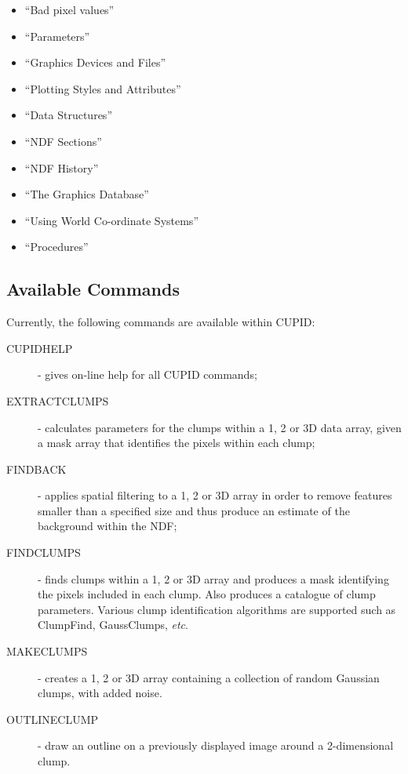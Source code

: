 \documentclass[twoside,11pt]{article}
\newcommand{\htmlref}[2]{#1}
\newcommand{\xref}[3]{#1}
\newcommand{\xlabel}[1]{}
\renewcommand{\_}{\texttt{\symbol{95}}}
\begin{document}
\begin{itemize}
\item ``\xref{Bad pixel values}{sun95}{se_masking}''
\item ``\xref{Parameters}{sun95}{se_param}''
\item ``\xref{Graphics Devices and Files}{sun95}{se_graphdev}''
\item ``\xref{Plotting Styles and Attributes}{sun95}{se_style}''
\item ``\xref{Data Structures}{sun95}{se_datastr}''
\item ``\xref{NDF Sections}{sun95}{se_ndfsect}''
\item ``\xref{NDF History}{sun95}{se_ndfhistory}''
\item ``\xref{The Graphics Database}{sun95}{se_agitate}''
\item ``\xref{Using World Co-ordinate Systems}{sun95}{se_wcsuse}''
\item ``\xref{Procedures}{sun95}{se_procedures}''
\end{itemize}

\subsection{\xlabel{availablecommands}Available Commands}
Currently, the following commands are available within CUPID:
\begin{description}

\item[\htmlref{CUPIDHELP}{CUPIDHELP}] - gives on-line help for all CUPID
commands;

\item[\htmlref{EXTRACTCLUMPS}{EXTRACTCLUMPS}] - calculates parameters for
the clumps within a 1, 2 or 3D data array, given a mask array that identifies
the pixels within each clump;

\item[\htmlref{FINDBACK}{FINDBACK}] - applies spatial filtering to a 1, 2
or 3D array in order to remove features smaller than a specified size and
thus produce an estimate of the background within the NDF;

\item[\htmlref{FINDCLUMPS}{FINDCLUMPS}] - finds clumps within a 1, 2 or 3D
array and produces a mask identifying the pixels included in each clump.
Also produces a catalogue of clump parameters. Various clump
identification algorithms are supported such as ClumpFind, GaussClumps,
\emph{etc}.

\item[\htmlref{MAKECLUMPS}{MAKECLUMPS}] - creates a 1, 2 or 3D array
containing a collection of random Gaussian clumps, with added noise.

\item[\htmlref{OUTLINECLUMP}{OUTLINECLUMP}] - draw an outline on a
previously displayed image around a 2-dimensional clump.

\end{description}
\end{document}
